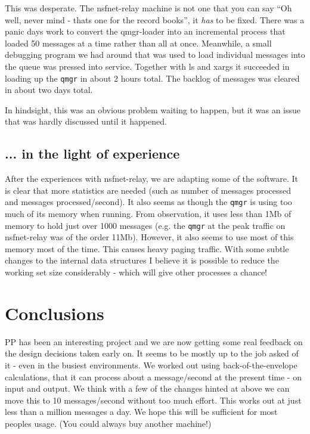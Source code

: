 This was desperate. The nsfnet-relay machine is not one that you can
say ``Oh well, never mind - thats one for the record books'', it {\em
has} to be fixed. There was a panic days work to convert the
qmgr-loader into an incremental process that loaded 50 messages at a
time rather than all at once. Meanwhile, a small debugging program we
had around that was used to load individual messages into the queue
was pressed into service. Together with ls and xargs it succeeded in
loading up the
\verb|qmgr| in about 2 hours total. The backlog of messages was cleared in
about two days total.

In hindsight, this was an obvious problem waiting to happen, but it
was an issue that was hardly discussed until it happened.

\subsection{... in the light of experience}
After the experiences with nsfnet-relay, we are adapting some of the
software. It is clear that more statistics are needed (such as number
of messages processed and messages processed/second). It also seems as
though the \verb|qmgr| is using too much of its memory when running. From
observation, it uses less than 1Mb of memory to hold just over 1000
messages (e.g. the \verb|qmgr| at the peak traffic on nsfnet-relay was of the
order 11Mb). However, it also seems to use most of this memory most of
the time. This causes heavy paging traffic. With some subtle changes
to the internal data structures I believe it is possible to reduce the
working set size considerably - which will give other processes a
chance!

\section{Conclusions}
PP has been an interesting project and we are now getting some real
feedback on the design decisions taken early on. It seems to be mostly
up to the job asked of it - even in the busiest environments. We
worked out using back-of-the-envelope calculations, that it can
process about a message/second at the present time - on input and
output. We think with a few of the changes hinted at above we can move
this to 10 messages/second without too much effort. This works out at
just less than a million messages a day. We hope this will be
sufficient for most peoples usage. (You could always buy another
machine!)




\showsummary


